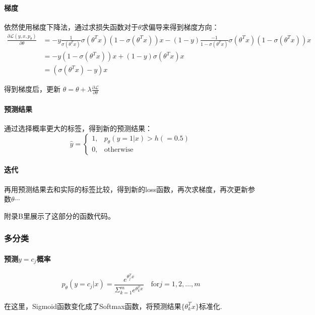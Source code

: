 \paragraph{梯度} 依然使用梯度下降法，通过求损失函数对于$\theta$求偏导来得到梯度方向：
\begin{equation}
\nonumber
  \begin{aligned}
    \displaystyle\frac{\partial \mathcal L(y,x,p_\theta)}{\partial \theta} 
    & = -y\frac{1}{\sigma(\theta^Tx)}\sigma(\theta^Tx)(1-\sigma(\theta^Tx))x - (1-y)\frac{-1}{1-\sigma(\theta^Tx)}\sigma(\theta^Tx)(1-\sigma(\theta^Tx))x \\
    &= -y(1-\sigma(\theta^Tx))x + (1-y)\sigma(\theta^Tx) x \\
    & = (\sigma(\theta^Tx)-y)x
  \end{aligned}
\end{equation}

得到梯度后，更新 $\theta = \theta + \lambda \frac{\partial \mathcal L}{\partial \theta}$
\paragraph{预测结果}
通过选择概率更大的标签，得到新的预测结果：
\begin{equation}
  \nonumber
  \hat y = 
  \begin{cases}
    1, & p_\theta(y=1|x)> h(=0.5) \\
    0, & \text{otherwise}
  \end{cases}
\end{equation}
\paragraph{迭代} 再用预测结果去和实际的标签比较，得到新的loss函数，再次求梯度，再次更新参数$\theta\cdots$

附录B里展示了这部分的函数代码。

\subsubsection{多分类}
\paragraph{预测$y=c_j$概率}

$$p_\theta(y=c_j|x) = \displaystyle \frac{e^{\theta_j^Tx}}{\Sigma_{k=1}^m e^{\theta_k^T x}} \quad \text{for} j = 1,2,\dots,m$$

在这里，Sigmoid函数变化成了Softmax函数，将预测结果$\{\theta_k^Tx\}$标准化.

